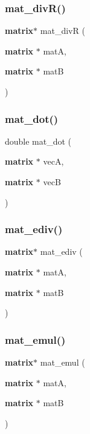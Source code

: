 \mbox{\label{mat_lib_8h_ad129031237989e250ea53468a0980ca4}} 
\subsubsection{mat\+\_\+div\+R()}
{\footnotesize\ttfamily \textbf{ matrix}$\ast$ mat\+\_\+divR (\begin{DoxyParamCaption}\item[{\textbf{ matrix} $\ast$}]{matA,  }\item[{\textbf{ matrix} $\ast$}]{matB }\end{DoxyParamCaption})}

\mbox{\label{mat_lib_8h_a6fbd56b6f8c2a2efd1ab73d6b740f020}} 
\subsubsection{mat\+\_\+dot()}
{\footnotesize\ttfamily double mat\+\_\+dot (\begin{DoxyParamCaption}\item[{\textbf{ matrix} $\ast$}]{vecA,  }\item[{\textbf{ matrix} $\ast$}]{vecB }\end{DoxyParamCaption})}

\mbox{\label{mat_lib_8h_a4af28a0c7ee575b0b75de300dade8bfe}} 
\subsubsection{mat\+\_\+ediv()}
{\footnotesize\ttfamily \textbf{ matrix}$\ast$ mat\+\_\+ediv (\begin{DoxyParamCaption}\item[{\textbf{ matrix} $\ast$}]{matA,  }\item[{\textbf{ matrix} $\ast$}]{matB }\end{DoxyParamCaption})}

\mbox{\label{mat_lib_8h_a81d18551040c46532037d7948c70a37b}} 
\subsubsection{mat\+\_\+emul()}
{\footnotesize\ttfamily \textbf{ matrix}$\ast$ mat\+\_\+emul (\begin{DoxyParamCaption}\item[{\textbf{ matrix} $\ast$}]{matA,  }\item[{\textbf{ matrix} $\ast$}]{matB }\end{DoxyParamCaption})}

